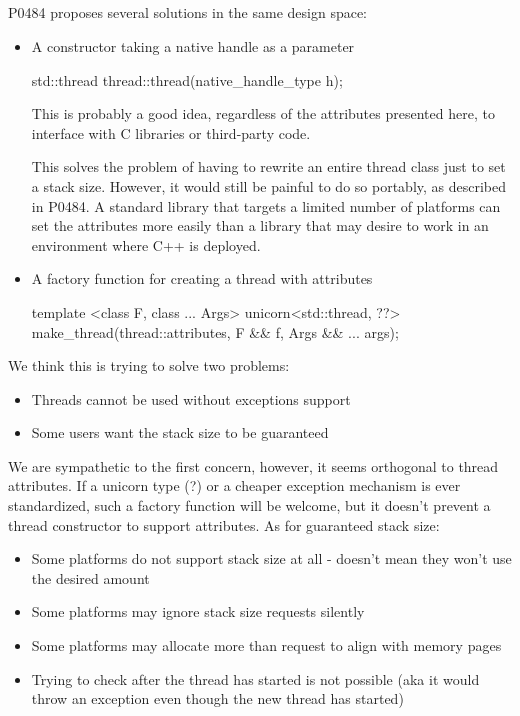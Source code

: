 \documentclass{wg21}
\begin{document}
\subsection{}

P0484 proposes several solutions in the same design space:

\begin{itemize}
\item  A constructor taking a native handle as a parameter
\begin{codeblock}
std::thread thread::thread(native_handle_type h);
\end{codeblock}

This is probably a good idea, regardless of the attributes presented here,
to interface with C libraries or third-party code.

This solves the problem of having to rewrite an entire thread class just to set a stack size.
However, it would still be painful to do so portably, as described in P0484.
A standard library that targets a limited number of platforms can set the attributes more easily than a library that may desire to work in an environment where C++ is deployed.

\item A factory function for creating a thread with attributes
\begin{codeblock}
template <class F, class ... Args>
unicorn<std::thread, ??> make_thread(thread::attributes, F && f, Args && ... args);
\end{codeblock}
\end{itemize}

We think this is trying to solve two problems:

\begin{itemize}
\item  Threads cannot be used without exceptions support
\item  Some users want the stack size to be guaranteed
\end{itemize}

We are sympathetic to the first concern, however, it seems orthogonal to thread attributes.
If a unicorn type (?) or a cheaper exception mechanism is ever standardized,
such a factory function will be welcome, but it doesn't prevent a thread constructor to support attributes.
As for guaranteed stack size:

\begin{itemize}
\item  Some platforms do not support stack size at all - doesn't mean they won't use the desired amount
\item  Some platforms may ignore stack size requests silently
\item  Some platforms may allocate more than request to align with memory pages
\item  Trying to check after the thread has started is not possible (aka it would throw an exception even though the new thread has started)
\end{itemize}
\end{document}
